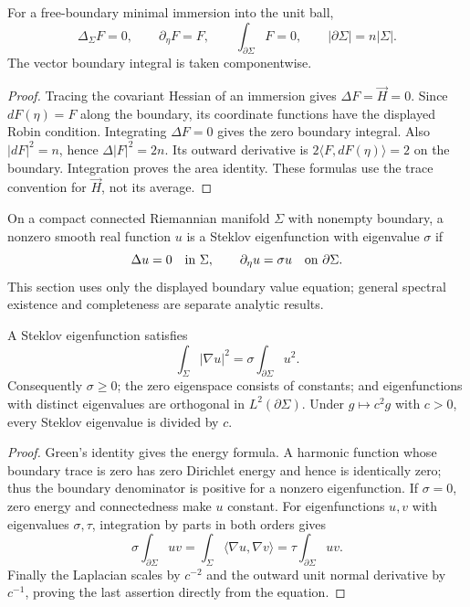 \begin{proposition}\label{prop:free-boundary-coordinate-identities}
For a free-boundary minimal immersion into the unit ball,
\[
 \Delta_\Sigma F=0,\qquad \partial_\eta F=F,\qquad
 \int_{\partial\Sigma}F=0,\qquad
 |\partial\Sigma|=n|\Sigma|.
\]
The vector boundary integral is taken componentwise.
\end{proposition}
\begin{proof}
Tracing the covariant Hessian of an immersion gives $\Delta F=\vec H=0$. Since $dF(\eta)=F$ along the boundary, its coordinate functions have the displayed Robin condition. Integrating $\Delta F=0$ gives the zero boundary integral. Also $|dF|^2=n$, hence $\Delta|F|^2=2n$. Its outward derivative is $2\langle F,dF(\eta)\rangle=2$ on the boundary. Integration proves the area identity. These formulas use the trace convention for $\vec H$, not its average.
\end{proof}

\begin{definition}\label{def:steklov-equation}
On a compact connected Riemannian manifold $\Sigma$ with nonempty boundary, a nonzero smooth real function $u$ is a Steklov eigenfunction with eigenvalue $\sigma$ if
\[
 \Delta u=0\quad\hbox{in }\Sigma,\qquad
 \partial_\eta u=\sigma u\quad\hbox{on }\partial\Sigma.
\]
This section uses only the displayed boundary value equation; general spectral existence and completeness are separate analytic results.
\end{definition}

\begin{proposition}\label{prop:steklov-elementary-identities}
A Steklov eigenfunction satisfies
\[
 \int_\Sigma|\nabla u|^2=\sigma\int_{\partial\Sigma}u^2.
\]
Consequently $\sigma\geq0$; the zero eigenspace consists of constants; and eigenfunctions with distinct eigenvalues are orthogonal in $L^2(\partial\Sigma)$. Under $g\mapsto c^2g$ with $c>0$, every Steklov eigenvalue is divided by $c$.
\end{proposition}
\begin{proof}
Green's identity gives the energy formula. A harmonic function whose boundary trace is zero has zero Dirichlet energy and hence is identically zero; thus the boundary denominator is positive for a nonzero eigenfunction. If $\sigma=0$, zero energy and connectedness make $u$ constant. For eigenfunctions $u,v$ with eigenvalues $\sigma,\tau$, integration by parts in both orders gives
\[
 \sigma\int_{\partial\Sigma}uv=\int_\Sigma\langle\nabla u,\nabla v\rangle
 =\tau\int_{\partial\Sigma}uv.
\]
Finally the Laplacian scales by $c^{-2}$ and the outward unit normal derivative by $c^{-1}$, proving the last assertion directly from the equation.
\end{proof}

